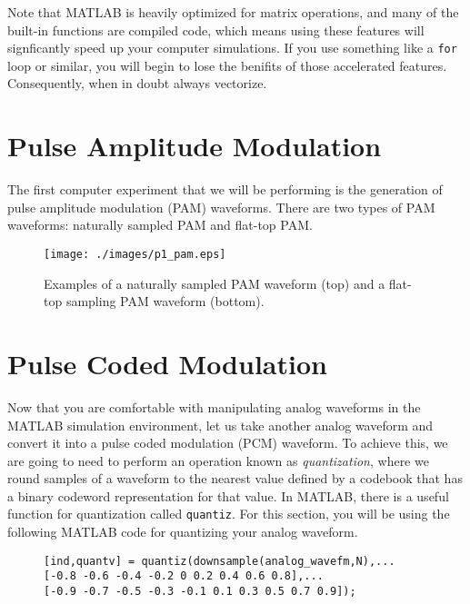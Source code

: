 \documentclass[letterpaper,12pt]{article}
\begin{document}
Note that MATLAB is heavily optimized for matrix operations, and many of the built-in functions are compiled code, which means using these features will signficantly speed up your computer simulations.  If you use something like a \texttt{for} loop or similar, you will begin to lose the benifits of those accelerated features.  Consequently, when in doubt always vectorize.

\section{Pulse Amplitude Modulation}

The first computer experiment that we will be performing is the generation of pulse amplitude modulation (PAM) waveforms. There are two types of PAM waveforms: naturally sampled PAM and flat-top PAM.



\begin{figure}[h]
 \centering
 \texttt{[image: ./images/p1\_pam.eps]}
 \caption{Examples of a naturally sampled PAM waveform (top) and a flat-top sampling PAM waveform (bottom).}\label{f:p1_pam}
\end{figure}

\section{Pulse Coded Modulation}
\label{sec:pcm}

Now that you are comfortable with manipulating analog waveforms in the MATLAB simulation environment, let us take another analog waveform and convert it into a pulse coded modulation (PCM) waveform.  To achieve this, we
are going to need to perform an operation known as \textit{quantization}, where we round samples of a waveform to the nearest value defined by a codebook that has a binary codeword representation for that value.  In MATLAB, there
is a useful function for quantization called \texttt{quantiz}. For this section, you will be using the following MATLAB code for quantizing your analog waveform.
\begin{figure}[h]
\centering
\begin{minipage}[framed]{0.9\textwidth}
\begin{lstlisting}
[ind,quantv] = quantiz(downsample(analog_wavefm,N),...
[-0.8 -0.6 -0.4 -0.2 0 0.2 0.4 0.6 0.8],...
[-0.9 -0.7 -0.5 -0.3 -0.1 0.1 0.3 0.5 0.7 0.9]);
\end{lstlisting}
\end{minipage}
\captionsetup{labelformat=empty}
\end{figure}
\end{document}
